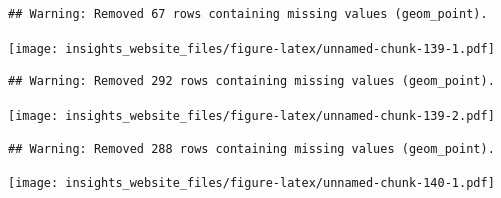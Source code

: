 \documentclass[]{book}
\newenvironment{Shaded}{\begin{snugshade}}{\end{snugshade}}
\newcommand{\DataTypeTok}[1]{\textcolor[rgb]{0.13,0.29,0.53}{#1}}
\newcommand{\FloatTok}[1]{\textcolor[rgb]{0.00,0.00,0.81}{#1}}
\newcommand{\KeywordTok}[1]{\textcolor[rgb]{0.13,0.29,0.53}{\textbf{#1}}}
\newcommand{\NormalTok}[1]{#1}
\newcommand{\OperatorTok}[1]{\textcolor[rgb]{0.81,0.36,0.00}{\textbf{#1}}}
\newcommand{\StringTok}[1]{\textcolor[rgb]{0.31,0.60,0.02}{#1}}
\begin{document}
\begin{verbatim}
## Warning: Removed 67 rows containing missing values (geom_point).
\end{verbatim}

\texttt{[image: insights\_website\_files/figure-latex/unnamed-chunk-139-1.pdf]}

\begin{Shaded}
\end{Shaded}

\begin{verbatim}
## Warning: Removed 292 rows containing missing values (geom_point).
\end{verbatim}

\texttt{[image: insights\_website\_files/figure-latex/unnamed-chunk-139-2.pdf]}

\begin{Shaded}
\end{Shaded}

\begin{verbatim}
## Warning: Removed 288 rows containing missing values (geom_point).
\end{verbatim}

\texttt{[image: insights\_website\_files/figure-latex/unnamed-chunk-140-1.pdf]}
\end{document}
